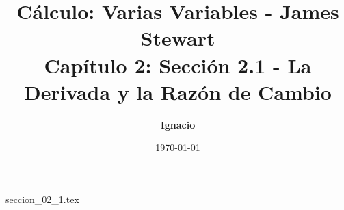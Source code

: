 \documentclass[11pt,spanish,oneside]{report}
\title{\textbf{Cálculo: Varias Variables - James Stewart} \\ \Large Capítulo 2: Sección 2.1 - La Derivada y la Razón de Cambio}
\author{\textbf{Ignacio}}
\date{\today}
\begin{document}
\maketitle

{seccion_02_1.tex}
\end{document}
